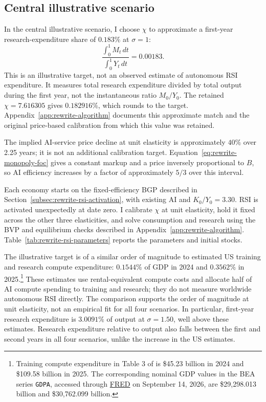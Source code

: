 \subsection{Central illustrative scenario}
\label{subsec:rewrite-rsi-half-decline}

In the central illustrative scenario, I choose $\chi$ to approximate a
first-year research-expenditure share of $0.183\%$ at $\sigma=1$:
\begin{equation}
 \frac{\int_0^1 M_t\,dt}{\int_0^1 Y_t\,dt}=0.00183.
 \label{eq:rewrite-rsi-central-research-target}
\end{equation}
This is an illustrative target, not an observed estimate of autonomous
RSI expenditure. It measures total research expenditure divided by total
output during the first year, not the instantaneous ratio $M_0/Y_0$.
The retained $\chi=7.616305$ gives $0.182916\%$, which rounds to the
target. Appendix~\ref{app:rewrite-algorithm} documents this approximate match
and the original price-based calibration from which this value was retained.

The implied AI-service price decline at unit elasticity is approximately
$40\%$ over 2.25 years; it is not an additional calibration target.
Equation~\eqref{eq:rewrite-monopoly-foc} gives a constant markup and a
price inversely proportional to $B$, so AI efficiency increases by a
factor of approximately $5/3$ over this interval.

Each economy starts on the fixed-efficiency BGP described in
Section~\ref{subsec:rewrite-rsi-activation}, with existing AI and
$K_0/Y_0=3.30$. RSI is activated unexpectedly at date zero. I calibrate
$\chi$ at unit elasticity, hold it fixed across the other three elasticities,
and solve consumption and research using the BVP and equilibrium checks
described in Appendix~\ref{app:rewrite-algorithm}.
Table~\ref{tab:rewrite-rsi-parameters} reports the parameters and initial stocks.



The illustrative target is of a similar order of magnitude to estimated
US training and research compute expenditure: $0.1544\%$ of GDP in 2024 and $0.3562\%$
in 2025.\footnote{Training compute expenditure in Table 3 of
\citet{korinekmckelvey2026} is \$45.23 billion in 2024 and \$109.58 billion
in 2025. The corresponding nominal GDP values in the BEA series
\texttt{GDPA}, accessed through
\href{https://fred.stlouisfed.org/data/GDPA}{FRED} on September 14, 2026,
are \$29,298.013 billion and \$30,762.099 billion.}
These estimates use rental-equivalent compute costs and allocate half of
AI compute spending to training and research; they do not measure worldwide
autonomous RSI directly. The comparison supports the order of magnitude at
unit elasticity, not an empirical fit for all four scenarios. In particular,
first-year research expenditure is $3.0091\%$ of output at $\sigma=1.50$,
well above these estimates. Research expenditure relative to output also
falls between the first and second years in all four scenarios, unlike the
increase in the US estimates.

